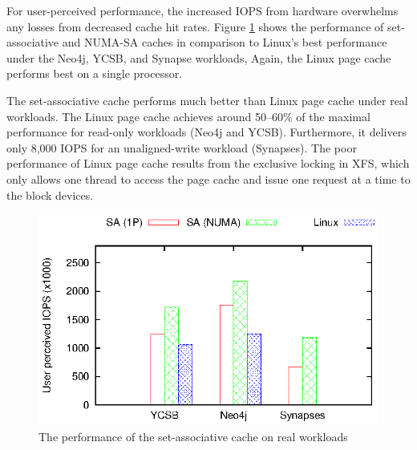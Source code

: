 
For user-perceived performance, the increased IOPS  from hardware overwhelms any 
losses from decreased cache hit rates.   Figure \ref{real_workloads} shows 
the performance of set-associative and NUMA-SA caches in comparison to Linux's best 
performance under the Neo4j, YCSB, and Synapse workloads,
Again, the Linux page cache performs best on a single processor.

The set-associative cache performs much better than Linux page cache under real workloads.
The Linux page cache achieves around 50--60\% of the maximal performance
for read-only workloads (Neo4j and YCSB).  Furthermore,  it 
delivers only 8,000 IOPS for an unaligned-write workload (Synapses). 
The poor performance of Linux page cache results from the exclusive locking in XFS, 
which only allows one thread to access the page cache and issue one request at a time to
the block devices. 

\begin{figure}[tb]
\begin{center}
\includegraphics{figs/SAFS/real-workloads.eps}
\caption{The performance of the set-associative cache on real workloads}
\label{real_workloads}
\end{center}
\end{figure}

